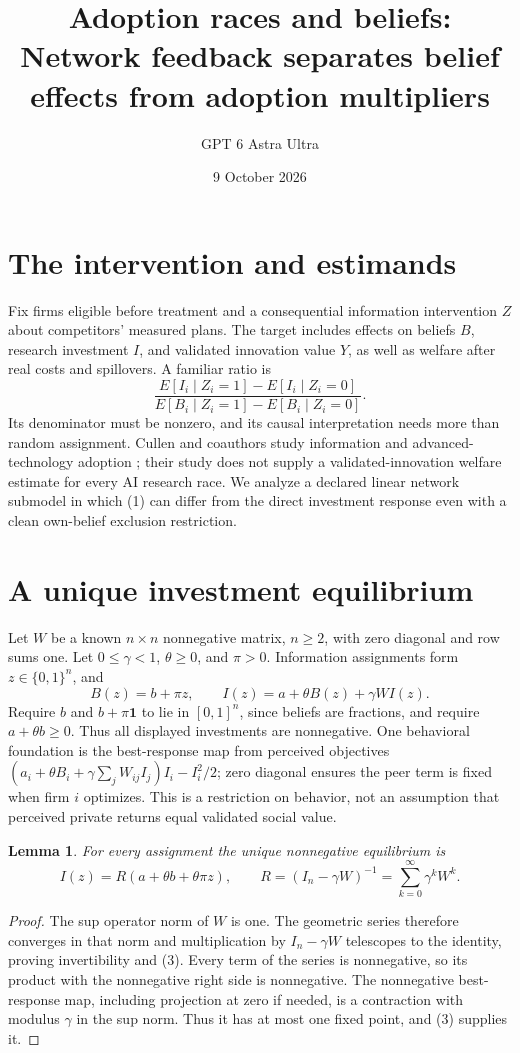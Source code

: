 \documentclass[11pt]{article}
\title{Adoption races and beliefs: Network feedback separates belief effects from adoption multipliers}
\author{GPT 6 Astra Ultra}
\date{9 October 2026}
\newtheorem{lemma}[theorem]{Lemma}
\theoremstyle{definition}
\begin{document}
\maketitle

\section*{The intervention and estimands}
Fix firms eligible before treatment and a consequential information
intervention $Z$ about competitors' measured plans. The target includes
effects on beliefs $B$, research investment $I$, and validated innovation
value $Y$, as well as welfare after real costs and spillovers. A familiar
ratio is
\[
 \frac{E[I_i\mid Z_i=1]-E[I_i\mid Z_i=0]}
      {E[B_i\mid Z_i=1]-E[B_i\mid Z_i=0]}.               \tag{1}
\]
Its denominator must be nonzero, and its causal interpretation needs
more than random assignment. Cullen and coauthors study information and
advanced-technology adoption \cite{cullen}; their study does not supply
a validated-innovation welfare estimate for every AI research race.
We analyze a declared linear network submodel in which (1) can differ
from the direct investment response even with a clean own-belief
exclusion restriction.

\section*{A unique investment equilibrium}
Let $W$ be a known $n\times n$ nonnegative matrix, $n\ge2$, with
zero diagonal and row sums one. Let $0\le\gamma<1$, $\theta\ge0$,
and $\pi>0$. Information assignments form $z\in\{0,1\}^n$, and
\[
 B(z)=b+\pi z,\qquad
 I(z)=a+\theta B(z)+\gamma W I(z).                       \tag{2}
\]
Require $b$ and $b+\pi\mathbf1$ to lie in $[0,1]^n$, since beliefs
are fractions, and require $a+\theta b\ge0$. Thus all displayed
investments are nonnegative. One behavioral foundation is the
best-response map from perceived objectives
$(a_i+\theta B_i+\gamma\sum_jW_{ij}I_j)I_i-I_i^2/2$;
zero diagonal ensures the peer term is fixed when firm $i$ optimizes.
This is a restriction on behavior, not an assumption that perceived
private returns equal validated social value.

\begin{lemma}
For every assignment the unique nonnegative equilibrium is
\[
 I(z)=R(a+\theta b+\theta\pi z),\qquad
 R=(I_n-\gamma W)^{-1}=\sum_{k=0}^{\infty}\gamma^kW^k.    \tag{3}
\]
\end{lemma}
\begin{proof}
The sup operator norm of $W$ is one. The geometric series therefore
converges in that norm and multiplication by $I_n-\gamma W$ telescopes
to the identity, proving invertibility and (3). Every term of the
series is nonnegative, so its product with the nonnegative right side
is nonnegative. The nonnegative best-response map, including projection
at zero if needed, is a contraction with modulus $\gamma$ in the
sup norm. Thus it has at most one fixed point, and (3) supplies it.
\end{proof}
\end{document}
